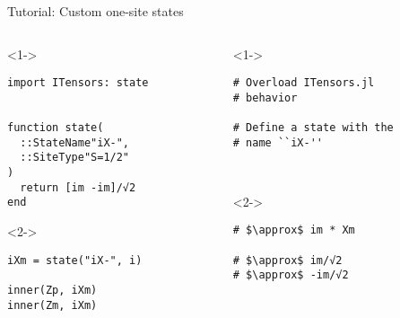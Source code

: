 \begin{frame}[fragile]{Tutorial: Custom one-site states}

\begin{columns}

\begin{column}{4.5cm}

\begin{onlyenv}<1->

\begin{lstlisting}[language=JuliaLocal, style=julia, basicstyle=\small]
import ITensors: state


function state(
  ::StateName"iX-",
  ::SiteType"S=1/2"
)
  return [im -im]/√2
end
\end{lstlisting}

\end{onlyenv}

\begin{onlyenv}<2->

\begin{lstlisting}[language=JuliaLocal, style=julia, basicstyle=\small]
iXm = state("iX-", i)

inner(Zp, iXm)
inner(Zm, iXm)
\end{lstlisting}

\end{onlyenv}

\end{column}

\begin{column}{4.5cm}

\begin{onlyenv}<1->

\begin{lstlisting}[style=julia, numbers=none, mathescape, basicstyle=\small]
# Overload ITensors.jl
# behavior

# Define a state with the
# name ``iX-''



 \end{lstlisting}

\end{onlyenv}

\begin{onlyenv}<2->

\begin{lstlisting}[style=julia, numbers=none, mathescape, basicstyle=\small]
# $\approx$ im * Xm

# $\approx$ im/√2
# $\approx$ -im/√2
\end{lstlisting}

\end{onlyenv}

\end{column}

\end{columns}

\end{frame}

